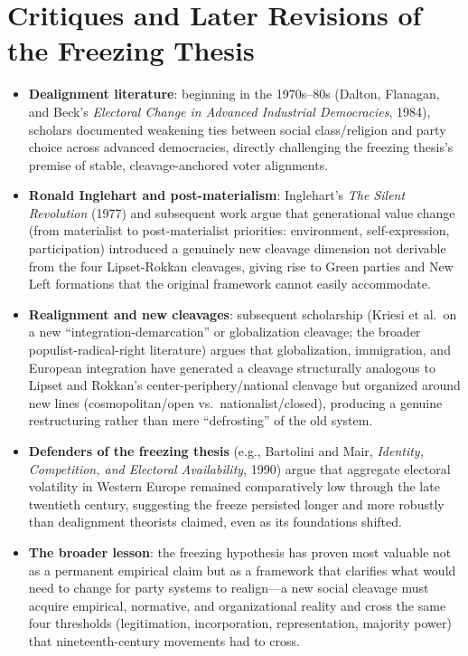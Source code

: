 \documentclass[12pt]{article}
\begin{document}
\section{Critiques and Later Revisions of the Freezing Thesis}

\begin{itemize}[leftmargin=*, itemsep=4pt]
    \item \textbf{Dealignment literature}: beginning in the 1970s--80s (Dalton, Flanagan, and Beck's \textit{Electoral Change in Advanced Industrial Democracies}, 1984), scholars documented weakening ties between social class/religion and party choice across advanced democracies, directly challenging the freezing thesis's premise of stable, cleavage-anchored voter alignments.
    \item \textbf{Ronald Inglehart and post-materialism}: Inglehart's \textit{The Silent Revolution} (1977) and subsequent work argue that generational value change (from materialist to post-materialist priorities: environment, self-expression, participation) introduced a genuinely new cleavage dimension not derivable from the four Lipset-Rokkan cleavages, giving rise to Green parties and New Left formations that the original framework cannot easily accommodate.
    \item \textbf{Realignment and new cleavages}: subsequent scholarship (Kriesi et al.\ on a new ``integration-demarcation'' or globalization cleavage; the broader populist-radical-right literature) argues that globalization, immigration, and European integration have generated a cleavage structurally analogous to Lipset and Rokkan's center-periphery/national cleavage but organized around new lines (cosmopolitan/open vs.\ nationalist/closed), producing a genuine restructuring rather than mere ``defrosting'' of the old system.
    \item \textbf{Defenders of the freezing thesis} (e.g., Bartolini and Mair, \textit{Identity, Competition, and Electoral Availability}, 1990) argue that aggregate electoral volatility in Western Europe remained comparatively low through the late twentieth century, suggesting the freeze persisted longer and more robustly than dealignment theorists claimed, even as its foundations shifted.
    \item \textbf{The broader lesson}: the freezing hypothesis has proven most valuable not as a permanent empirical claim but as a framework that clarifies what would need to change for party systems to realign---a new social cleavage must acquire empirical, normative, and organizational reality and cross the same four thresholds (legitimation, incorporation, representation, majority power) that nineteenth-century movements had to cross.
\end{itemize}
\end{document}
